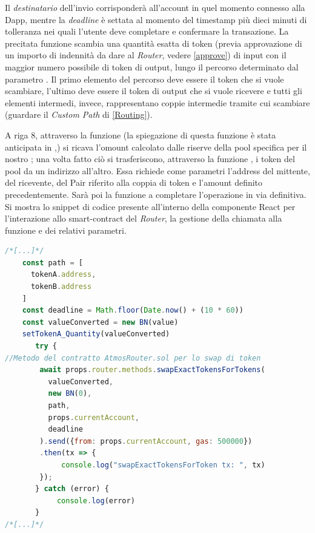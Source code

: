 Il \textit{destinatario} dell'invio corrisponderà all'account in quel momento connesso alla Dapp, mentre la \textit{deadline} è settata al momento del timestamp più dieci minuti di tolleranza nei quali l'utente deve completare e confermare la transazione.
La precitata funzione scambia una quantità esatta di token (previa approvazione di un importo di indennità da dare al \textit{Router}, vedere \ref{approve}) di input con il maggior numero possibile di token di output, lungo il percorso determinato dal parametro . Il primo elemento del percorso deve essere il token che si vuole scambiare, l'ultimo deve essere il token di output che si vuole ricevere e tutti gli elementi intermedi, invece, rappresentano coppie intermedie tramite cui scambiare (guardare il \textit{Custom Path} di \ref{Routing}).

A riga 8, attraverso la funzione  (la spiegazione di questa funzione è stata anticipata in \textcourier{\ref{getPriceLiquidity}},) si ricava l'omount calcolato dalle riserve della pool specifica per il nostro ; una volta fatto ciò si trasferiscono, attraverso la funzione , i token del pool da un indirizzo all'altro. Essa richiede come parametri l'address del mittente, del ricevente, del Pair riferito alla coppia di token e l'amount definito precedentemente.
Sarà poi la funzione  a completare l'operazione in via definitiva.
Si mostra lo snippet di codice presente all'interno della componente React  per l'interazione allo smart-contract del \textit{Router}, la gestione della chiamata alla funzione \textcourier{\ref{swapExactTokensForTokens}} e dei relativi parametri.

\begin{lstlisting}[caption={[Call \textcourier{swapExactTokensForTokens} Function (front-end) ]},language=jsx] 
/*[...]*/
    const path = [
      tokenA.address,
      tokenB.address
    ]
    const deadline = Math.floor(Date.now() + (10 * 60))
    const valueConverted = new BN(value)
    setTokenA_Quantity(valueConverted)
       try {
//Metodo del contratto AtmosRouter.sol per lo swap di token
        await props.router.methods.swapExactTokensForTokens(
          valueConverted,
          new BN(0),
          path,
          props.currentAccount,
          deadline
        ).send({from: props.currentAccount, gas: 500000})
        .then(tx => {
             console.log("swapExactTokensForToken tx: ", tx)
        });
       } catch (error) {
            console.log(error)
       }
/*[...]*/
                                                                                          -swapExactTokensForTokens(front-end)
\end{lstlisting}\makeatletter{}\makeatother
\label{swapExactTokensForTokens(front-end)}

